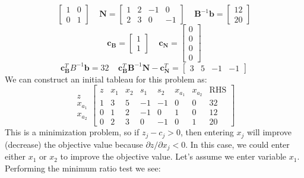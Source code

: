\begin{example}
\begin{displaymath}
\begin{bmatrix}
1 & 0\\
0 & 1
\end{bmatrix}\;\;\;\;
\mathbf{N} = \begin{bmatrix}
1 & 2 & -1 & 0\\
2 & 3 & 0 & -1
\end{bmatrix}\;\;\;\;
\mathbf{B}^{-1}\mathbf{b} = 
\begin{bmatrix}
12\\20
\end{bmatrix}
\end{displaymath}
\begin{displaymath}
\mathbf{c_B} = \begin{bmatrix}
1\\
1
\end{bmatrix}\;\;\;\;
\mathbf{c_N} = \begin{bmatrix}
0\\0\\0\\0
\end{bmatrix}
\end{displaymath}
\begin{displaymath}
\mathbf{c}_\mathbf{B}^TB^{-1}\mathbf{b} = 32\;\;\;\;
\mathbf{c}_\mathbf{B}^T\mathbf{B}^{-1}\mathbf{N} - \mathbf{c}_{\mathbf{N}}^T = \begin{bmatrix}
3 & 5 & -1 & -1
\end{bmatrix}
\end{displaymath}
We can construct an initial tableau for this problem as:
\begin{equation}
\begin{array}{c}
\\
z\\
x_{a_1}\\
x_{a_2}
\end{array}
\left[
\begin{array}{c|cccccc|c}
z & x_1 & x_2 & s_1 & s_2 & x_{a_1} & x_{a_2} & \text{RHS}\\
\hline
1 & 3 & 5 & -1 & -1 & 0 & 0 & 32\\
\hline
0 & 1 & 2 & -1 & 0  & 1 & 0 & 12\\
0 & 2 & 3 & 0  & -1 & 0 & 1 & 20
\end{array}
\right]
\end{equation}
This is a minimization problem, so if $z_j - c_j > 0$, then entering $x_j$ will improve (decrease) the objective value because $\partial z/\partial x_j < 0$. In this case, we could enter either $x_1$ or $x_2$ to improve the objective value. Let's assume we enter variable $x_1$. Performing the minimum ratio test we see:

\end{example}

